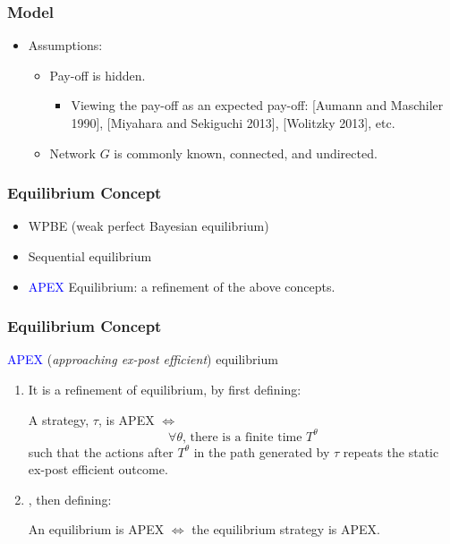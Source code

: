 \documentclass[8pt]{beamer}
\begin{document}
\begin{frame}
  \frametitle{Model}

\begin{itemize}
\item Assumptions:
\begin{itemize}
\item Pay-off is hidden.
\begin{itemize}
\item Viewing the pay-off as an expected pay-off:  [Aumann and Maschiler 1990], [Miyahara and Sekiguchi 2013], [Wolitzky 2013], etc.
\end{itemize}
\item Network $G$ is \alert{commonly known}, \alert{connected}, and \alert{undirected}.
\end{itemize}
\end{itemize}



\end{frame}


\begin{frame}
  \frametitle{Equilibrium Concept}

\begin{itemize}
\item WPBE (weak perfect Bayesian equilibrium)
\item Sequential equilibrium
\item \textcolor{blue}{APEX} Equilibrium: a refinement of the above concepts.
\end{itemize}
\end{frame}


\begin{frame}
  \frametitle{Equilibrium Concept}

\textcolor{blue}{APEX} (\textit{approaching ex-post efficient}) equilibrium
\begin{enumerate}
\item It is a refinement of equilibrium, by first defining:
\begin{definition}
A strategy, $\tau$, is APEX $\Leftrightarrow$ 
\[\text{$\forall\theta$,  there is a finite time $T^{\theta}$}\] 
such that the actions after $T^{\theta}$ in the path generated by $\tau$ repeats the static ex-post efficient outcome.
\end{definition}
\item , then defining:  
\begin{definition}
An equilibrium is APEX $\Leftrightarrow$ the equilibrium strategy is APEX.
\end{definition}

\end{enumerate}
\end{frame}
\end{document}
